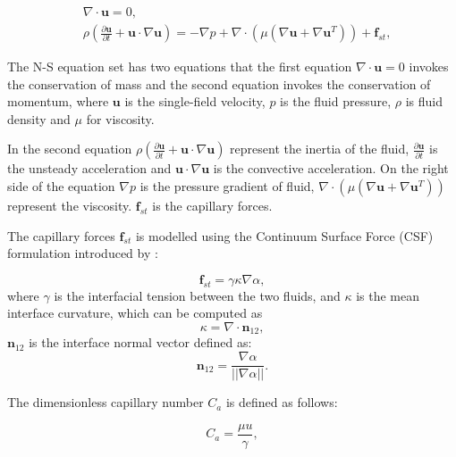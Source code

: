 \begin{equation}\label{NSEVOF}
\begin{aligned}
&\nabla\cdot \mathbf{u}  = 0, \\
&\rho\left(\frac{\partial \mathbf{u}}{\partial t}+ \mathbf{u}\cdot\nabla \mathbf{u}\right)=-\nabla p + \nabla\cdot\left(\mu\left(\nabla \mathbf{u} + \nabla \mathbf{u}^T\right)\right)+\mathbf{f}_{st},
\end{aligned}
\end{equation}

The N-S equation set has two equations that the first equation $\nabla\cdot \mathbf{u}  = 0$ invokes the conservation of mass and the second equation invokes the conservation of momentum, where $\mathbf{u}$ is the single-field velocity, $p$ is the fluid pressure, $\rho$ is fluid density and $\mu$ for viscosity.

In the second equation $\rho\left(\frac{\partial \mathbf{u}}{\partial t}+ \mathbf{u}\cdot\nabla \mathbf{u}\right)$ represent the inertia of the fluid, $\frac{\partial \mathbf{u}}{\partial t}$ is the unsteady acceleration and $\mathbf{u}\cdot\nabla \mathbf{u}$ is the convective acceleration. On the right side of the equation $\nabla p $ is the pressure gradient of fluid, $\nabla\cdot\left(\mu\left(\nabla \mathbf{u} + \nabla \mathbf{u}^T\right)\right)$ represent the viscosity. $\mathbf{f}_{st}$ is the capillary forces.

The capillary forces $\mathbf{f}_{st}$ is modelled using the Continuum Surface Force (CSF) formulation introduced by \cite{brackbill1992continuum}:

\begin{equation}
 \mathbf{f}_{st}=\gamma\kappa\nabla\alpha,
\end{equation}
where $\gamma$ is the interfacial tension between the two fluids, and
$\kappa$ is the mean interface curvature, which can be computed as
\begin{equation}
 \kappa = \nabla\cdot \mathbf{n}_{12},
\end{equation}
$\mathbf{n}_{12}$ is the interface normal vector defined as:
\begin{equation}
\mathbf{n}_{12} = \frac{\nabla\alpha}{||\nabla\alpha||}.
\end{equation}

The dimensionless capillary number $C_a$ is defined as follows:

\begin{equation}
 C_a=\frac{\mu u}{\gamma},
\end{equation}

